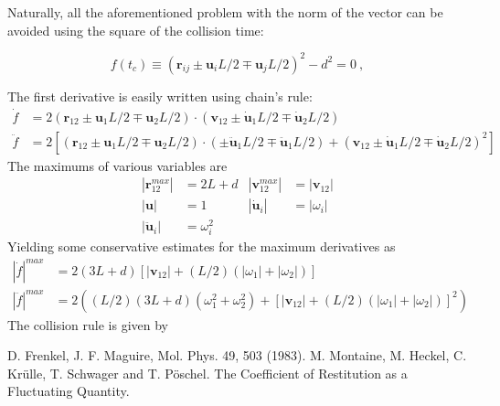 \documentclass[aps,pre,onecolumn,preprint,showpacs]{revtex4}
\begin{document}
Naturally, all the aforementioned problem with the norm of the vector can be avoided using the
square of the  collision time:

\begin{equation}
  \label{eq:f}
  f(t_c) \equiv (\mathbf{r}_{ij} \pm \mathbf{u}_{i}L/2 \mp \mathbf{u}_{j}L/2)^2 - d^2 = 0~,
\end{equation}

The first derivative is easily written using chain's rule:
\begin{align}
  \dot{f} &= 2(\mathbf{r}_{12} \pm \mathbf{u}_1 L/2 \mp \mathbf{u}_2 L/2)\cdot(\mathbf{v}_{12} \pm \dot{\mathbf{u}}_1 L/2 \mp \dot{\mathbf{u}}_2 L/2)\\
  \ddot{f} &=2 \left[ (\mathbf{r}_{12} \pm \mathbf{u}_1 L/2 \mp \mathbf{u}_2L/2)
    \cdot(\pm\ddot{\mathbf{u}}_1 L/2 \mp \ddot{\mathbf{u}}_1L/2 )
    + (\mathbf{v}_{12} \pm \dot{\mathbf{u}}_1 L/2 \mp \dot{\mathbf{u}}_2 L/2)^2 \right]
\end{align}
The maximums of various variables are
\begin{align*}
  \left|\mathbf{r}_{12}^{max}\right|&= 2L + d & \left|\mathbf{v}_{12}^{max}\right|&= \left| \mathbf{v}_{12}\right|\\ 
  \left|\mathbf{u}\right|&= 1 & \left|\dot{\mathbf{u}}_i\right|&= \left|\omega_i\right|\\
  \left|\ddot{\mathbf{u}}_i\right|&= \omega_i^2
\end{align*}
Yielding some conservative estimates for the maximum derivatives as
\begin{align}
  \left|\dot{f}\right|^{max} &= 2(3L + d)\left[\left|\mathbf{v}_{12}\right| +  (L / 2) (\left|\omega_1\right| + \left|\omega_2\right|)\right]\\
  \left|\ddot{f}\right|^{max} &=2 \left((L / 2) (3L + d) (\omega_1^2 +  \omega_2^2)
  + \left[\left|\mathbf{v}_{12}\right| + (L/2) \left(\left|\omega_1\right| + \left|\omega_2\right|\right)\right]^2 \right)
\end{align}
The collision rule is given by \cite{Montaine}
\begin{thebibliography}{}

  D. Frenkel, J. F. Maguire, Mol. Phys. 49, 503 (1983).
 M. Montaine, M. Heckel, C. Kr\"ulle, T. Schwager and T. P\"oschel. The
Coefficient of Restitution as a Fluctuating Quantity.

\end{thebibliography}
\end{document}
